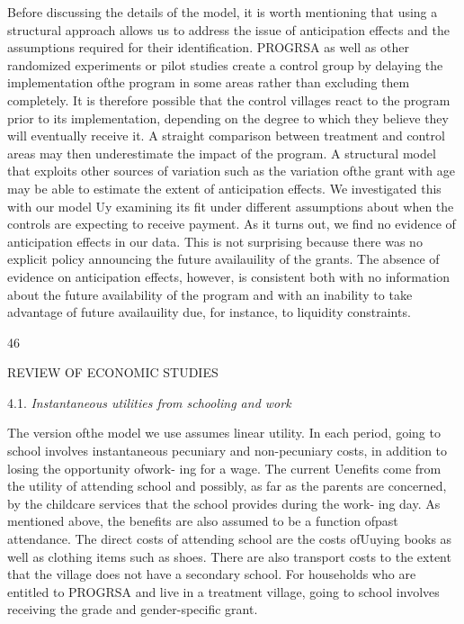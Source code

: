 Before discussing the details of the model, it is worth mentioning that using a structural approach allows us to address the issue of anticipation effects and the assumptions required for their identification. PROGRSA as well as other randomized experiments or pilot studies create a control group by delaying the implementation ofthe program in some areas rather than excluding them completely. It is therefore possible that the control villages react to the program prior to its implementation, depending on the degree to which they believe they will eventually receive it. A straight comparison between treatment and control areas may then underestimate the impact of the program. A structural model that exploits other sources of variation such as the variation ofthe grant with age may be able to estimate the extent of anticipation effects. We investigated this with our model Uy examining its fit under different assumptions about when the controls are expecting to receive payment. As it turns out, we find no evidence of anticipation effects in our data. This is not surprising because there was no explicit policy announcing the future availauility of the grants. The absence of evidence on anticipation effects, however, is consistent both with no information about the future availability of the program and with an inability to take advantage of future availauility due, for instance, to liquidity constraints.

46

REVIEW OF ECONOMIC STUDIES

4.1. {\it Instantaneous utilities from schooling and work}

The version ofthe model we use assumes linear utility. In each period, going to school involves instantaneous pecuniary and non-pecuniary costs, in addition to losing the opportunity ofwork- ing for a wage. The current Uenefits come from the utility of attending school and possibly, as far as the parents are concerned, by the childcare services that the school provides during the work- ing day. As mentioned above, the benefits are also assumed to be a function ofpast attendance. The direct costs of attending school are the costs ofUuying books as well as clothing items such as shoes. There are also transport costs to the extent that the village does not have a secondary school. For households who are entitled to PROGRSA and live in a treatment village, going to school involves receiving the grade and gender-specific grant.

